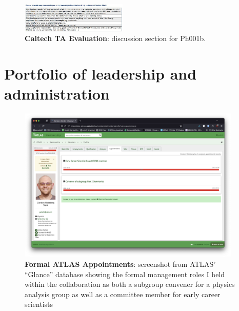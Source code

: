 \begin{figure}[h!]
	\hspace{1em}
\end{figure}

\begin{figure}[h!]
	\centering
	\caption{\textbf{Caltech TA Evaluation}: discussion section for Ph001b.}
	\includegraphics[width=0.45\textwidth]{attachments/E-teaching/2010_Ph1}
\end{figure}


\chapter{Portfolio of leadership and administration}

\begin{figure}[h!]
	\centering
	\caption{\textbf{Formal ATLAS Appointments}: screenshot from ATLAS' \enquote{Glance} database showing the formal management roles I held within the collaboration as both a subgroup convener for a physics analysis group as well as a committee member for early career scientists}
	\includegraphics[width=0.95\textwidth]{attachments/F-leadership/atlasAppointments}
\end{figure}

